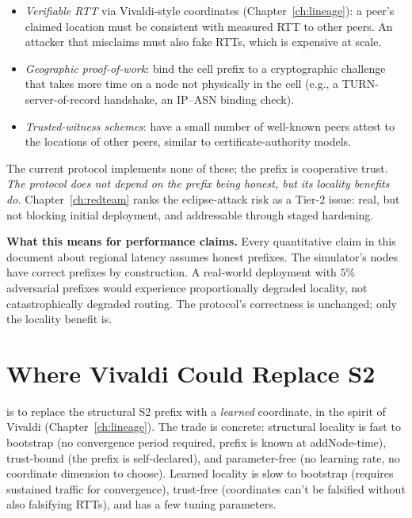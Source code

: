 \documentclass[twoside,nobib]{tufte-book}
\begin{document}
\begin{itemize}\setlength\itemsep{0.15em}
  \item \emph{Verifiable RTT} via Vivaldi-style coordinates
    (Chapter~\ref{ch:lineage}): a peer's claimed location must be
    consistent with measured RTT to other peers. An attacker
    that misclaims must also fake RTTs, which is expensive at
    scale.
  \item \emph{Geographic proof-of-work}: bind the cell prefix to a
    cryptographic challenge that takes more time on a node not
    physically in the cell (e.g., a TURN-server-of-record
    handshake, an IP--ASN binding check).
  \item \emph{Trusted-witness schemes}: have a small number of
    well-known peers attest to the locations of other peers,
    similar to certificate-authority models.
\end{itemize}

The current protocol implements none of these; the prefix is
cooperative trust. \emph{The protocol does not depend on the
prefix being honest, but its locality benefits do.}
Chapter~\ref{ch:redteam} ranks the eclipse-attack risk as a
Tier-2 issue: real, but not blocking initial deployment, and
addressable through staged hardening.

\textbf{What this means for performance claims.} Every quantitative
claim in this document about regional latency assumes honest
prefixes. The simulator's nodes have correct prefixes by
construction. A real-world deployment with $5\%$ adversarial
prefixes would experience proportionally degraded locality, not
catastrophically degraded routing. The protocol's correctness is
unchanged; only the locality benefit is.

\section{Where Vivaldi Could Replace S2}

 is to replace the structural S2 prefix
with a \emph{learned} coordinate, in the spirit of Vivaldi
(Chapter~\ref{ch:lineage}). The trade is concrete: structural
locality is fast to bootstrap (no convergence period required,
prefix is known at addNode-time), trust-bound (the prefix is
self-declared), and parameter-free (no learning rate, no
coordinate dimension to choose). Learned locality is slow to
bootstrap (requires sustained traffic for convergence), trust-free
(coordinates can't be falsified without also falsifying RTTs),
and has a few tuning parameters.
\end{document}
